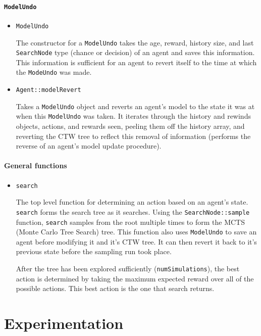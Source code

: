 \documentclass[pdftex,twoside,a4paper]{report}
\begin{document}
\subsubsection{\texttt{ModelUndo}}
\begin{itemize}
\item{\texttt{ModelUndo}

	The constructor for a \texttt{ModelUndo} takes the age, reward, history size, and last \texttt{SearchNode} type (chance or decision) of an agent and saves this information. This information is sufficient for an agent to revert itself to the time at which the \texttt{ModeUndo} was made.

}

\item{\texttt{Agent::modelRevert}

	Takes a \texttt{ModelUndo} object and reverts an agent's model to the state it was at when this \texttt{ModelUndo} was taken. It iterates through the history and rewinds objects, actions, and rewards seen, peeling them off the history array, and reverting the CTW tree to reflect this removal of information (performs the reverse of an agent's model update procedure).

}
\end{itemize}
\subsubsection{General functions}
\begin{itemize}
\item{\texttt{search}
	
	The top level function for determining an action based on an agent's state. \texttt{search} forms the search tree as it searches. Using the \texttt{SearchNode::sample} function, \texttt{search} samples from the root multiple times to form the MCTS (Monte Carlo Tree Search) tree. This function also uses \texttt{ModelUndo} to save an agent before modifying it and it's CTW tree. It can then revert it back to it's previous state before the sampling run took place.
	
	After the tree has been explored sufficiently (\texttt{numSimulations}), the best action is determined by taking the maximum expected reward over all of the possible actions. This best action is the one that search returns.
}
	
\end{itemize}

\chapter{Experimentation}
\end{document}
